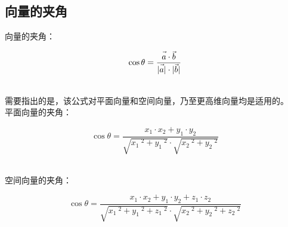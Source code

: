\documentclass[UTF8]{ctexart}
\let\nvec\vec
\def\vec#1{\nvec{\vphantom b\smash{#1}}}
\begin{document}
\subsection{向量的夹角}
    向量的夹角：
    \begin{large}
        \begin{equation*}
            \cos{\theta}=\frac{\vec{a}\cdot\vec{b}}{|\vec{a}|\cdot|\vec{b}|}
        \end{equation*}
    \end{large}\\
    需要指出的是，该公式对平面向量和空间向量，乃至更高维向量均是适用的。\\[6mm]
    平面向量的夹角：
    \begin{large}
        \begin{equation*}
            \cos{\theta}=\frac{x_1\cdot x_2+y_1\cdot y_2}{\sqrt{x_1~^2+y_1~^2}\cdot\sqrt{x_2~^2+y_2~^2}}
        \end{equation*}
    \end{large}\\
    空间向量的夹角：
    \begin{large}
        \begin{equation*}
            \cos{\theta}=\frac{x_1\cdot x_2+y_1\cdot y_2+z_1\cdot z_2}{\sqrt{x_1~^2+y_1~^2+z_1~^2}\cdot\sqrt{x_2~^2+y_2~^2+z_2~^2}}
        \end{equation*}
    \end{large}

\newpage
\end{document}
